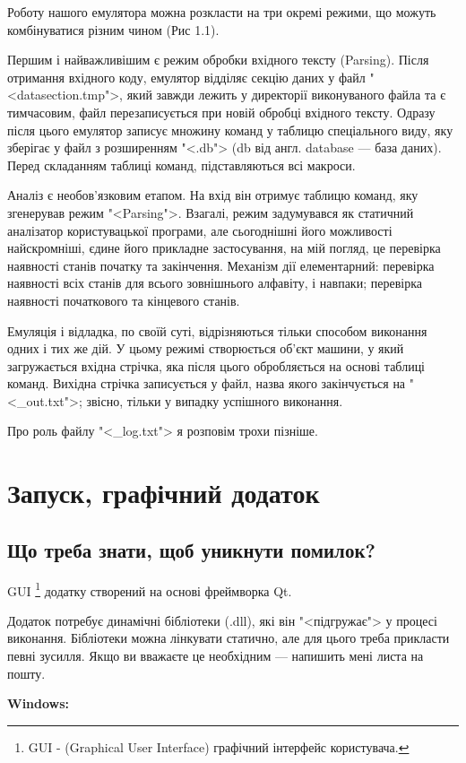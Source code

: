 \documentclass[oneside,final,14pt]{extreport}
\begin{document}
Роботу нашого емулятора можна розкласти на три окремі режими, що можуть комбінуватися різним чином (Рис 1.1).

Першим і найважливішим є режим обробки вхідного тексту (Parsing). Після отримання вхідного коду, емулятор відділяє секцію даних у файл "<datasection.tmp">, який завжди лежить у директорії виконуваного файла та є тимчасовим, файл перезаписується при новій обробці вхідного тексту. Одразу після цього емулятор записує множину команд у таблицю спеціального виду, яку зберігає у файл з розширенням "<.db"> (db від англ. database --- база даних). Перед складанням таблиці команд, підставляються всі макроси.

Аналіз є необов'язковим етапом. На вхід він отримує таблицю команд, яку згенерував режим "<Parsing">. Взагалі, режим задумувався як статичний аналізатор користувацької програми, але сьогоднішні його можливості найскромніші, єдине його прикладне застосування, на мій погляд, це перевірка наявності станів початку та закінчення. Механізм дії елементарний: перевірка наявності всіх станів для всього зовнішнього алфавіту, і навпаки; перевірка наявності початкового та кінцевого станів.

Емуляція і відладка, по своїй суті, відрізняються тільки способом виконання одних і тих же дій. У цьому режимі створюється об'єкт машини, у який загружається вхідна стрічка, яка після цього обробляється на основі таблиці команд. Вихідна стрічка записується у файл, назва якого закінчується на "<\_out.txt">; звісно, тільки у випадку успішного виконання.

Про роль файлу "<\_log.txt"> я розповім трохи пізніше.

\chapter{Запуск, графічний додаток}
\section{Що треба знати, щоб уникнути помилок?}
GUI
\footnote{GUI - (Graphical User Interface) графічний інтерфейс користувача.}
 додатку створений на основі фреймворка Qt.

Додаток потребує динамічні бібліотеки (.dll), які він "<підгружає"> у процесі виконання. 
Бібліотеки можна лінкувати статично, але для цього треба прикласти певні зусилля. Якщо ви вважаєте це необхідним --- напишить мені листа на пошту.

\textbf{Windows:}
\end{document}
